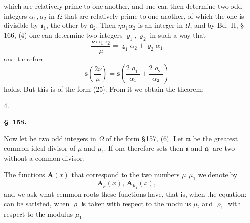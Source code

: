 which are relatively prime to one another, and one can then
determine two odd integers $\alpha_1, \alpha_2$ in $\Omega$ that are relatively
prime to one another, of which the one is divisible by $\mathfrak{a}_1$, the
other by $\mathfrak{a}_2$. Then $\eta\alpha_1\alpha_2$ is an integer in $\Omega$,
and by Bd.\ II, \S\,166, (4) one can determine two integers $\varrho_1, \varrho_2$
in such a way that
\[
\frac{\nu\,\alpha_1\alpha_2}{\mu} = \varrho_1\alpha_2 + \varrho_2\alpha_1
\]
and therefore
\[
\boldsymbol{s}\!\left(\frac{2\nu}{\mu}\right) = \boldsymbol{s}\!\left(\frac{2\varrho_1}{\alpha_1} + \frac{2\varrho_2}{\alpha_2}\right)
\]
holds. But this is of the form (25). From it we obtain
the theorem:

4. 

\begin{center}
\textbf{\S\ 158. }
\end{center}

Now let
be two odd integers in $\Omega$ of the form \S\,157, (6). Let
$\mathfrak{m}$ be the greatest common ideal divisor of $\mu$ and $\mu_1$.
If one therefore sets
then $\mathfrak{a}$ and $\mathfrak{a}_1$ are two  without a common
divisor.

The functions $\boldsymbol{A}(x)$ that correspond to the two numbers $\mu, \mu_1$
we denote by
\[
\boldsymbol{A}_\mu(x), \ \boldsymbol{A}_{\mu_1}(x),
\]
and we ask what common roots these functions
have, that is, when the equation:
can be satisfied, when $\varrho$ is taken with respect to the modulus $\mu$, and $\varrho_1$
with respect to the modulus $\mu_1$.
